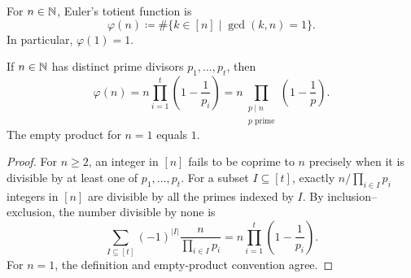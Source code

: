 \documentclass[11pt, oneside]{article}
\begin{document}
\begin{definition}
For $n\in\mathbb{N}$, Euler's totient function is
\[
\varphi(n)\coloneqq\#\{k\in[n]\mid\gcd(k, n)=1\}.
\]
In particular, $\varphi(1)=1$.
\end{definition}
\begin{theorem}\label{thm:euler}
If $n\in\mathbb{N}$ has distinct prime divisors $p_1, \ldots, p_t$, then
\[
\varphi(n)=n\prod_{i=1}^t\left(1-\frac1{p_i}\right)
=n\prod_{\substack{p\mid n\\p\text{ prime}}}\left(1-\frac1p\right).
\]
The empty product for $n=1$ equals $1$.
\end{theorem}
\begin{proof}
For $n\ge2$, an integer in $[n]$ fails to be coprime to $n$ precisely when it is divisible by at least one of $p_1, \ldots, p_t$. For a subset $I\subseteq[t]$, exactly $n/\displaystyle\prod_{i\in I}p_i$ integers in $[n]$ are divisible by all the primes indexed by $I$. By inclusion--exclusion, the number divisible by none is
\[
\sum_{I\subseteq[t]}(-1)^{|I|}\frac{n}{\prod_{i\in I}p_i}
=n\prod_{i=1}^t\left(1-\frac1{p_i}\right).
\]
For $n=1$, the definition and empty-product convention agree.
\end{proof}
\end{document}
